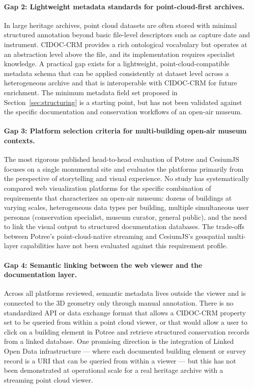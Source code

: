 \documentclass[]{report}
\begin{document}
\paragraph{Gap 2: Lightweight metadata standards for point-cloud-first archives.}
In large heritage archives, point cloud datasets are often stored with minimal structured
annotation beyond basic file-level descriptors such as capture date and instrument. CIDOC-CRM
provides a rich ontological vocabulary but operates at an abstraction level above the file,
and its implementation requires specialist knowledge. A practical gap exists for a lightweight,
point-cloud-compatible metadata schema that can be applied consistently at dataset level across
a heterogeneous archive and that is interoperable with CIDOC-CRM for future enrichment.
The minimum metadata field set proposed in Section~\ref{sec:structuring} is a starting point,
but has not been validated against the specific documentation and conservation workflows of
an open-air museum.

\paragraph{Gap 3: Platform selection criteria for multi-building open-air museum contexts.}
The most rigorous published head-to-head evaluation of Potree and CesiumJS~\cite{gaspari2023webgl} focuses on a single monumental site and
evaluates the platforms primarily from the perspective of storytelling and visual experience.
No study has systematically compared web visualization platforms for the specific combination
of requirements that characterizes an open-air museum: dozens of buildings at varying scales,
heterogeneous data types per building, multiple simultaneous user personas (conservation
specialist, museum curator, general public), and the need to link the visual output to
structured documentation databases. The trade-offs between Potree's point-cloud-native
streaming and CesiumJS's geospatial multi-layer capabilities have not been evaluated against
this requirement profile.

\paragraph{Gap 4: Semantic linking between the web viewer and the documentation layer.}
Across all platforms reviewed, semantic metadata lives outside the viewer and is connected
to the 3D geometry only through manual annotation. There is no standardized API or data
exchange format that allows a CIDOC-CRM property set to be queried from within a
point cloud viewer, or that would allow a user to click on a building element in Potree
and retrieve structured conservation records from a linked database. One promising direction
is the integration of Linked Open Data infrastructure --- where each documented building
element or survey record is a URI that can be queried from within a viewer --- but this
has not been demonstrated at operational scale for a real heritage archive with a streaming
point cloud viewer.
\end{document}
